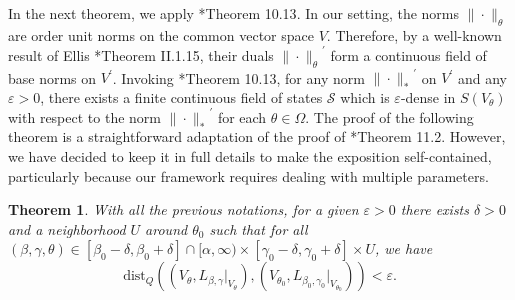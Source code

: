 \documentclass[a4paper,11pt,reqno]{amsart}
\theoremstyle{plain}
\newtheorem{thm}{Theorem}[section]
\theoremstyle{mainthmstyle}
\theoremstyle{named}
\numberwithin{equation}{section}
\begin{document}
In the next theorem, we apply \cite{Rieffel-Gromov}*{Theorem 10.13}. In our setting, the norms $\|\cdot\|_{\theta}$ are order unit norms on the common vector space $V$. Therefore, by a well-known result of Ellis \cite{Erik-Ellis}*{Theorem II.1.15}, their duals ${\|\cdot\|_{\theta}}^{\prime}$ form a continuous field of base norms on $V^{\prime}$. Invoking \cite{Rieffel-Gromov}*{Theorem 10.13}, for any norm ${\|\cdot\|_{\ast}}^{\prime}$ on $V^{\prime}$ and any $\varepsilon > 0$, there exists a finite continuous field of states $\mathcal {S}$ which is $\varepsilon$-dense in $S(V_{\theta})$ with respect to the norm ${\|\cdot\|_{\ast}}^{\prime}$ for each $\theta \in \Omega.$ The proof of the following theorem is a straightforward adaptation of the proof of \cite{Rieffel-Gromov}*{Theorem 11.2}. However, we have decided to keep it in full details to make the exposition self-contained, particularly because our framework requires dealing with multiple parameters.

\begin{thm} \label{joint continuity lem}
With all the previous notations, for a given $\varepsilon > 0$ there exists $\delta > 0$ and a neighborhood $U$ around $\theta_0$ such that for all $(\beta,\gamma,\theta) \in \left [\beta_0 - \delta, \beta_0 + \delta \right ] \cap [\alpha, \infty)\times [\gamma_0 - \delta, \gamma_0 + \delta ]\times U$, we have
$$\mathrm{dist}_{Q} \left (\left (V_{\theta}, L_{\beta, \gamma} \big \rvert_{V_{\theta}} \right ), \left (V_{\theta_0}, L_{\beta_0, \gamma_0} \big \rvert_{V_{\theta_0}} \right ) \right ) < \varepsilon.$$
\end{thm}
\end{document}

